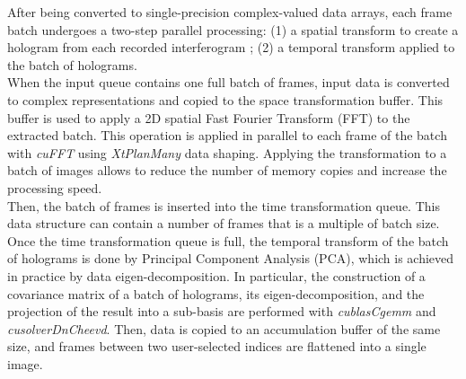 After being converted to single-precision complex-valued data arrays, each frame batch undergoes a two-step parallel processing: (1) a spatial transform to create a hologram from each recorded interferogram ; (2) a temporal transform applied to the batch of holograms.\\

When the input queue contains one full batch of frames, input data is converted to complex representations and copied to the space transformation buffer. This buffer is used to apply a 2D spatial Fast Fourier Transform (FFT) to the extracted batch. This operation is applied in parallel to each frame of the batch with \textit{cuFFT} using \textit{XtPlanMany} data shaping. Applying the transformation to a batch of images allows to reduce the number of memory copies and increase the processing speed.\\

Then, the batch of frames is inserted into the time transformation queue. This data structure can contain a number of frames that is a multiple of batch size. Once the time transformation queue is full, the temporal transform of the batch of holograms is done by Principal Component Analysis (PCA), which is achieved in practice by data eigen-decomposition. In particular, the construction of a covariance matrix of a batch of holograms, its eigen-decomposition, and the projection of the result into a sub-basis are performed with \textit{cublasCgemm} and \textit{cusolverDnCheevd}. Then, data is copied to an accumulation buffer of the same size, and frames between two user-selected indices are flattened into a single image.